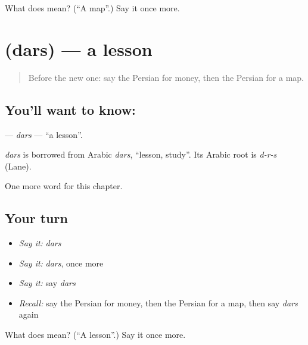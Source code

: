 \begin{tcolorbox}[breakable,colback=teal!4,colframe=teal!35!black,title={Before you move on}]
What does  mean? (\textquotedblleft{}A map\textquotedblright{}.) Say it once more.
\end{tcolorbox}
\section[\texorpdfstring{\fa{درس} (dars)}{درس (dars)}]{ (dars) — a lesson}

\label{lesson:FA-C50-dars}



\begin{quote}
Before the new one: say the Persian for money, then the Persian for a map.
\end{quote}

\subsection*{You'll want to know: }
\textbf{} — \emph{dars} — \textquotedblleft{}a lesson\textquotedblright{}.

\begin{cousinweb}
\emph{dars} is borrowed from Arabic \emph{dars}, \textquotedblleft{}lesson, study\textquotedblright{}. Its Arabic root is \emph{d-r-s} (Lane).
\end{cousinweb}

\begin{grammarlens}[title={What you've built}]
One more word for this chapter.
\end{grammarlens}

\subsection*{Your turn}
\begin{itemize}
\raggedright
  \item \emph{Say it:} \emph{dars}
  \item \emph{Say it:} \emph{dars}, once more
  \item \emph{Say it:} say \emph{dars}
  \item \emph{Recall:} say the Persian for money, then the Persian for a map, then say \emph{dars} again
\end{itemize}

\begin{tcolorbox}[breakable,colback=teal!4,colframe=teal!35!black,title={Before you move on}]
What does  mean? (\textquotedblleft{}A lesson\textquotedblright{}.) Say it once more.
\end{tcolorbox}
